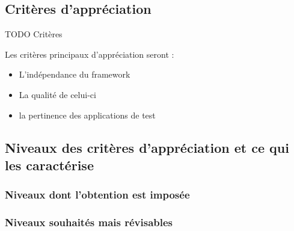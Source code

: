 \subsection{Critères d’appréciation}

TODO Critères

Les critères principaux d'appréciation seront : 
\begin{itemize}
 \item L'indépendance du framework
 \item La qualité de celui-ci
 \item la pertinence des applications de test
\end{itemize}


\subsection{Niveaux des critères d’appréciation et ce qui les caractérise}
\subsubsection{Niveaux dont l’obtention est imposée}
\subsubsection{Niveaux souhaités mais révisables}
